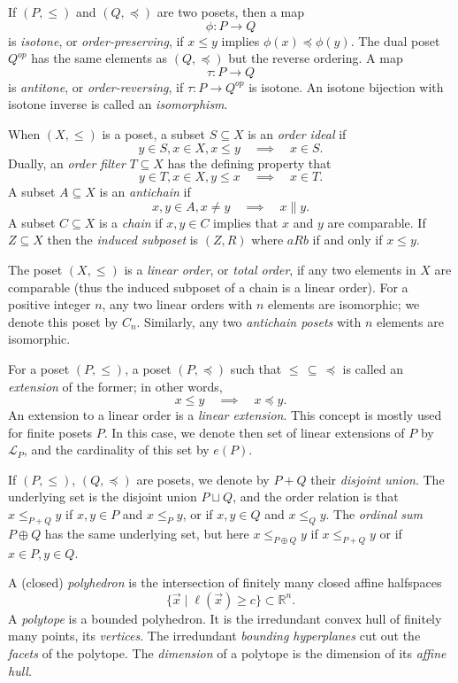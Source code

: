 \documentclass[11pt,a4paper,abstract=yes]{scrartcl}
\theoremstyle{plain}
\newcommand{\RR}{\mathbb{R}}
\newcommand{\linexts}[1]{\mathcal{L}_{#1}}
\begin{document}
If \((P,\le)\) and \((Q,\preceq)\) are two posets, then a map \[\phi: P \to Q\] is \emph{isotone}, or \emph{order-preserving},
if \(x \le y\) implies \(\phi(x) \preceq \phi(y)\). The dual poset \(Q^{op}\) has the same elements as \((Q,\preceq)\)
but the reverse ordering. A map \[\tau: P \to Q\] is \emph{antitone}, or \emph{order-reversing}, if
\(\tau: P \to Q^{op}\) is isotone. An isotone bijection with isotone inverse is called an \emph{isomorphism}.

When \((X,\le)\) is a poset,
a subset \(S \subseteq X\) is an \emph{order ideal} if
\[y \in S, x \in X, x \le y \quad  \implies \quad x \in S.\]
Dually, an \emph{order filter} \(T \subseteq X\) has the defining property that
\[y \in T, x \in X, y \le x \quad \implies \quad x \in T.\]
A subset \(A \subseteq X\) is an \emph{antichain} if
\[x,y \in A, x \neq y \quad \implies \quad x \parallel y. \]
A subset \(C \subseteq X\) is a \emph{chain} if \(x,y \in C\)  implies that \(x\) and \(y\) are comparable.
If \(Z \subseteq X\) then the \emph{induced subposet} is
\((Z,R)\) where \(a R b\) if and only if \(x \le y\).


The poset \((X,\le)\) is a \emph{linear order}, or \emph{total order},  if any two elements in \(X\) are
comparable (thus the induced subposet of a chain is a linear order). For a positive integer \(n\),
any two linear orders with \(n\) elements are isomorphic;
we denote this poset by \(C_{n}\). Similarly, any two \emph{antichain posets} with \(n\) elements
are isomorphic.

For a poset \((P,\le)\), a poset \((P, \preceq)\) such that \(\le \, \subseteq \, \preceq\) is called an \emph{extension}
of the former; in other words,
\[x \le y \quad \implies \quad x \preceq y.\]
An extension to a linear order is a \emph{linear extension}. This concept is mostly used
for finite posets \(P\). In this case, we denote then set of linear extensions of \(P\)
by \(\linexts{P}\), and the cardinality of this set by \(e(P)\).

If \((P,\le)\), \((Q, \preceq)\) are posets, we denote by \(P + Q\) their \emph{disjoint union}. The underlying set
is the disjoint union \(P \sqcup Q\), and the order relation is that \(x \le_{P + Q} y\) if
\(x,y \in P\) and \(x \le_{P} y\), or if
\(x,y \in Q\) and \(x \le_{Q} y\).
The \emph{ordinal sum} \(P \oplus Q\) has the same underlying set, but here \(x \le_{P \oplus Q} y\) if
\(x \le_{P + Q} y\) or if \(x \in P, y \in Q\).


A (closed) \emph{polyhedron} is the intersection of finitely many closed affine halfspaces
\[\{\vec{x} \mid \ell(\vec{x}) \ge c\} \subset \RR^{n}.\]
A \emph{polytope} is a bounded polyhedron. It is the
irredundant convex hull of finitely many points, its \emph{vertices}. The irredundant \emph{bounding hyperplanes}
cut out the \emph{facets} of the polytope. The \emph{dimension} of a polytope is the dimension of its
\emph{affine hull}.
\end{document}
